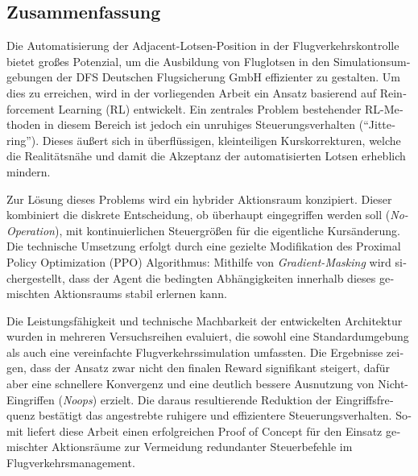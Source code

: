 \begin{otherlanguage}{ngerman}
	\chapter*{Zusammenfassung}
Die Automatisierung der Adjacent-Lotsen-Position in der Flugverkehrskontrolle bietet großes Potenzial, um die Ausbildung von Fluglotsen in den Simulationsumgebungen der \ac{DFS} Deutschen Flugsicherung GmbH effizienter zu gestalten. Um dies zu erreichen, wird in der vorliegenden Arbeit ein Ansatz basierend auf Reinforcement Learning (\ac{RL}) entwickelt. Ein zentrales Problem bestehender \ac{RL}-Methoden in diesem Bereich ist jedoch ein unruhiges Steuerungsverhalten (\enquote{Jittering}). Dieses äußert sich in überflüssigen, kleinteiligen Kurskorrekturen, welche die Realitätsnähe und damit die Akzeptanz der automatisierten Lotsen erheblich mindern.
\medskip

Zur Lösung dieses Problems wird ein hybrider Aktionsraum konzipiert. Dieser kombiniert die diskrete Entscheidung, ob überhaupt eingegriffen werden soll (\emph{No-Operation}), mit kontinuierlichen Steuergrößen für die eigentliche Kursänderung. Die technische Umsetzung erfolgt durch eine gezielte Modifikation des Proximal Policy Optimization (\acs{PPO}) Algorithmus: Mithilfe von \emph{Gradient\hyp{}Masking} wird sichergestellt, dass der Agent die bedingten Abhängigkeiten innerhalb dieses gemischten Aktionsraums stabil erlernen kann.
\medskip

Die Leistungsfähigkeit und technische Machbarkeit der entwickelten Architektur wurden in mehreren Versuchsreihen evaluiert, die sowohl eine Standardumgebung als auch eine vereinfachte Flugverkehrssimulation umfassten. Die Ergebnisse zeigen, dass der Ansatz zwar nicht den finalen Reward signifikant steigert, dafür aber eine schnellere Konvergenz und eine deutlich bessere Ausnutzung von Nicht-Eingriffen (\emph{Noops}) erzielt. Die daraus resultierende Reduktion der Eingriffsfrequenz bestätigt das angestrebte ruhigere und effizientere Steuerungsverhalten. Somit liefert diese Arbeit einen erfolgreichen Proof of Concept für den Einsatz gemischter Aktionsräume zur Vermeidung redundanter Steuerbefehle im Flugverkehrsmanagement.
	
\end{otherlanguage}
